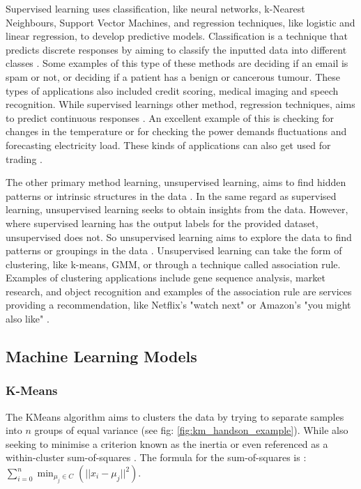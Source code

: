 	Supervised learning uses classification, like neural networks, k-Nearest Neighbours, Support Vector Machines, and regression techniques, like logistic and linear regression, to develop predictive models.  Classification is a technique that predicts discrete responses by aiming to classify the inputted data into different classes \cite{matlanintrotoml}. Some examples of this type of these methods are deciding if an email is spam or not, or deciding if a patient has a benign or cancerous tumour. These types of applications also included credit scoring, medical imaging and speech recognition. While supervised learnings other method, regression techniques, aims to predict continuous responses \cite{geron2019hands}. An excellent example of this is checking for changes in the temperature or for checking the power demands fluctuations and forecasting electricity load. These kinds of applications can also get used for trading  \cite{matlanintrotoml}.
	
	The other primary method learning, unsupervised learning, aims to find hidden patterns or intrinsic structures in the data \cite{geron2019hands}. In the same regard as supervised learning, unsupervised learning seeks to obtain insights from the data. However, where supervised learning has the output labels for the provided dataset, unsupervised does not. So unsupervised learning aims to explore the data to find patterns or groupings in the data \cite{matlanintrotoml}. Unsupervised learning can take the form of clustering, like k-means, GMM, or through a technique called association rule. Examples of clustering applications include gene sequence analysis, market research, and object recognition and examples of the association rule are services providing a recommendation, like Netflix's "watch next" or Amazon's "you might also like" \cite{matlanintrotoml}.
	
	
	\subsection{Machine Learning Models}
	
	\subsubsection{K-Means}
	The KMeans algorithm aims to clusters the data by trying to separate samples into $n$ groups of equal variance (see fig: \ref{fig:km_handson_example}). While also seeking to minimise a criterion known as the inertia or even referenced as a within-cluster sum-of-squares \cite{geron2019hands, sklearn_km}. The formula for the sum-of-squares is \cite{sklearn_km}: $\sum_{i=0}^{n}\min_{\mu_j \in C}(||x_i - \mu_j||^2)$. 
	
